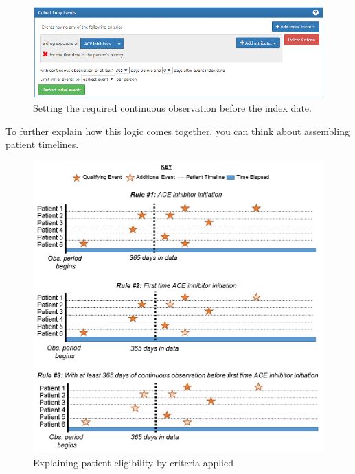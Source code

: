 \documentclass[11pt]{book}
\theoremstyle{definition}
\theoremstyle{definition}
\theoremstyle{definition}
\theoremstyle{remark}
\begin{document}
\begin{figure}

{\centering \includegraphics[width=1\linewidth]{images/Cohorts/initialEventAce} 

}

\caption{Setting the required continuous observation before the index date.}\label{fig:initialEventAce}
\end{figure}

To further explain how this logic comes together, you can think about
assembling patient timelines.

\begin{figure}

{\centering \includegraphics[width=1\linewidth]{images/Cohorts/EarliestEventExplained} 

}

\caption{Explaining patient eligibility by criteria applied}\label{fig:EarliestEventExplained}
\end{figure}
\end{document}
